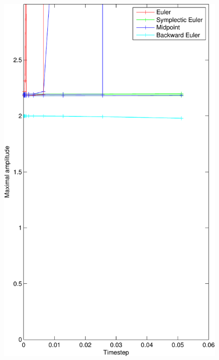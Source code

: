 \begin{figure}[]
	\begin{center}
		\includegraphics*[width=\textwidth]{graphics/StabilityDamp0_1-crop.pdf}
	\end{center}
	\caption{}
	\label{fig:}
\end{figure}
